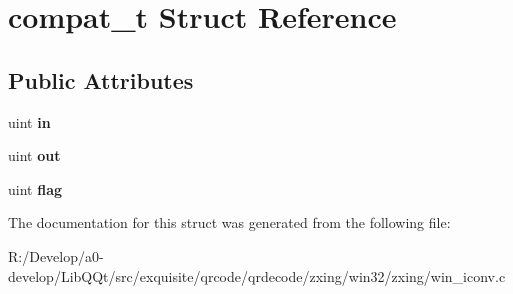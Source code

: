 \hypertarget{structcompat__t}{}\section{compat\+\_\+t Struct Reference}
\label{structcompat__t}
\subsection*{Public Attributes}
\begin{DoxyCompactItemize}
\item 
\mbox{\label{structcompat__t_aab528ea28f82cb1e07f8047a2e5cba9d}} 
uint {\bfseries in}
\item 
\mbox{\label{structcompat__t_a2f5b3119fa908e46662bbbc3b7871a0a}} 
uint {\bfseries out}
\item 
\mbox{\label{structcompat__t_aa88e2afd0ab0fc0acbfd12cdf3831662}} 
uint {\bfseries flag}
\end{DoxyCompactItemize}


The documentation for this struct was generated from the following file\+:\begin{DoxyCompactItemize}
\item 
R\+:/\+Develop/a0-\/develop/\+Lib\+Q\+Qt/src/exquisite/qrcode/qrdecode/zxing/win32/zxing/win\+\_\+iconv.\+c\end{DoxyCompactItemize}
